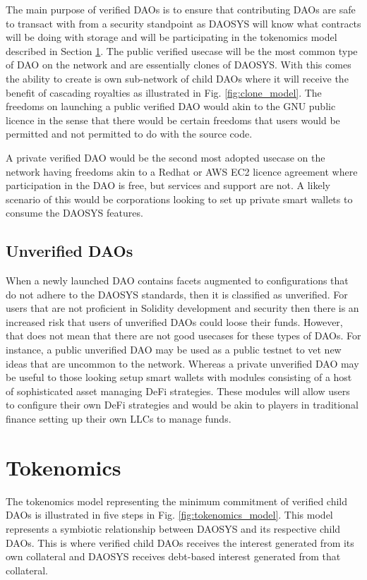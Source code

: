 \documentclass[journal,twocolumn,12pt]{ieeesyscoin}
\begin{document}
The main purpose of verified DAOs is to ensure that contributing DAOs are safe to transact with from a security standpoint as DAOSYS will know what contracts will be doing with storage and will be participating in the tokenomics model described in Section \ref{sec:tokenomics}. The public verified usecase will be the most common type of DAO on the network and are essentially clones of DAOSYS. With this comes the ability to create is own sub-network of child DAOs where it will receive the benefit of cascading royalties as illustrated in Fig. \ref{fig:clone_model}. The freedoms on launching a public verified DAO would akin to the GNU public licence in the sense that there would be certain freedoms that users would be permitted and not permitted to do with the source code.

A private verified DAO would be the second most adopted usecase on the network having freedoms akin to a Redhat or AWS EC2 licence agreement where participation in the DAO is free, but services and support are not. A likely scenario of this would be corporations looking to set up private smart wallets to consume the DAOSYS features.

\subsection{Unverified DAOs}
\label{sec:unverified}

When a newly launched DAO contains facets augmented to configurations that do not adhere to the DAOSYS standards, then it is classified as unverified. For users that are not proficient in Solidity development and security then there is an increased risk that users of unverified DAOs could loose their funds. However, that does not mean that there are not good usecases for these types of DAOs. For instance, a public unverified DAO may be used as a public testnet to vet new ideas that are uncommon to the network. Whereas a private unverified DAO may be useful to those looking setup smart wallets with modules consisting of a host of sophisticated asset managing DeFi strategies. These modules will allow users to configure their own DeFi strategies and would be akin to players in traditional finance setting up their own LLCs to manage funds.

\section{Tokenomics}
\label{sec:tokenomics}

The tokenomics model representing the minimum commitment of verified child DAOs is illustrated in five steps in Fig. \ref{fig:tokenomics_model}. This model represents a symbiotic relationship between DAOSYS and its respective child DAOs. This is where verified child DAOs receives the interest generated from its own collateral and DAOSYS receives debt-based interest generated from that collateral.
\end{document}
